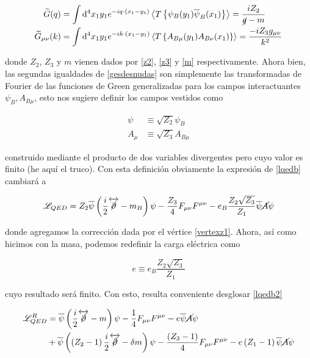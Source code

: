 \documentclass[tickz]{article}
\numberwithin{equation}{section}
\begin{document}
\begin{equation}\label{gesdesnudas}
\begin{aligned}
\widetilde{G}(q) &=\int \mathrm{d^4}x_1y_1 e^{-iq\cdot( x_1 - y_1)}\left\langle T\left\{ \psi_B(y_1)\overline{\psi}_B(x_1)\right\} \right\rangle = \frac{iZ_2}{\cancel{q}-m}\\
 \widetilde{G}_{\mu\nu}(k)&=\int \mathrm{d^4}x_1y_1 e^{-ik\cdot( x_1 - y_1)}\left\langle T\left\{ A_{B\mu}(y_1)A_{B\nu}(x_1)\right\}\right\rangle =\frac{-iZ_3g_{\mu\nu}}{k^2}
\end{aligned}
\end{equation}

donde $ Z_2 $, $ Z_3 $ y $ m $ vienen dados por \ref{z2}, \ref{z3} y \ref{m} respectivamente. Ahora bien, las segundas igualdades de \ref{gesdesnudas} son simplemente las transformadas de Fourier de las funciones de Green generalizadas para los campos interactuantes $ \psi_B, A_{B\mu} $, esto nos sugiere definir los campos vestidos como

\begin{equation}\label{key}
\begin{aligned}
\psi &\equiv \sqrt{Z_2}\psi_B\\
A_{\mu} &\equiv \sqrt{Z_3} A_{B\mu}
\end{aligned}
\end{equation}

construido mediante el producto de dos variables divergentes pero cuyo valor es finito (he aquí el truco). Con esta definición obviamente la expresión de \ref{lqedb} cambiará a 

\begin{equation}\label{lqedb2}
\mathscr{L}_{QED}=Z_2\overline{\psi}\left(\frac{i}{2}
\overleftrightarrow{\cancel{\partial}}-m_B\right)\psi-\frac{Z_3}{4}F_{ \mu\nu}F^{\mu\nu}-e_B\frac{Z_2 \sqrt{Z_3}}{Z_1}\overline{\psi}\cancel{A}\psi
\end{equation}

donde agregamos la corrección dada por el vértice \ref{vertexz1}. Ahora, así como hicimos con la masa, podemos redefinir la carga eléctrica como

\begin{equation}\label{e}
e \equiv e_B\frac{Z_2 \sqrt{Z_3}}{Z_1}
\end{equation}

cuyo resultado será finito. Con esto, resulta conveniente desglosar \ref{lqedb2}

\begin{equation}\label{lqedr}
\begin{aligned}
\mathscr{L}^{R}_{QED}&=\overline{\psi}\left(\frac{i}{2}
\overleftrightarrow{\cancel{\partial}}-m\right)\psi-\frac{1}{4}F_{ \mu\nu}F^{\mu\nu}-e\overline{\psi}\cancel{A}\psi\\
&+ \overline{\psi}\left( \left(Z_2 - 1\right)\frac{i}{2}\overleftrightarrow{\cancel{\partial}}-\delta m\right)\psi -\frac{\left(Z_3 -1\right)}{4}F_{ \mu\nu}F^{\mu\nu} - e\left(Z_1-1\right)\overline{\psi}\cancel{A}\psi
\end{aligned}
\end{equation}
\end{document}
